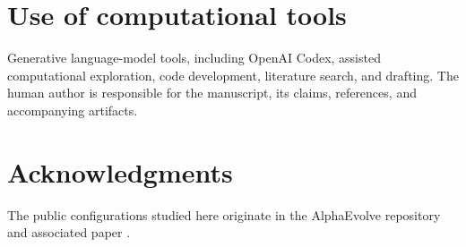 \documentclass[11pt]{article}
\theoremstyle{definition}
\theoremstyle{remark}
\begin{document}
\section*{Use of computational tools}

Generative language-model tools, including OpenAI Codex, assisted computational
exploration, code development, literature search, and drafting.  The human
author is responsible for the manuscript, its claims, references, and
accompanying artifacts.

\section*{Acknowledgments}

The public configurations studied here originate in the AlphaEvolve repository
and associated paper \cite{georgiev2025exploration,alphaevolve59}.



\end{document}
